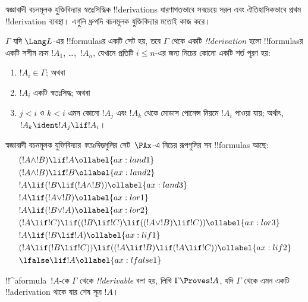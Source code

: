 \documentclass[../../../include/open-logic-section]{subfiles}
\begin{document}


স্বজ্ঞাবাদী বচনমূলক যুক্তিবিদ্যার স্বতঃসিদ্ধিক !!{derivation}s ধারণাগতভাবে
সবচেয়ে সরল এবং ঐতিহাসিকভাবে প্রথম !!{derivation} ব্যবস্থা। এগুলি
ধ্রুপদি বচনমূলক যুক্তিবিদ্যার মতোই কাজ করে।

\begin{defn}[!!^{derivability}]
$\Gamma$ যদি $\Lang L$-এর !!{formula}sর একটি সেট হয়, তবে
$\Gamma$ থেকে একটি \emph{!!{derivation}} হলো !!{formula}sর একটি সসীম
ক্রম $!A_1$, \dots,~$!A_n$, যেখানে প্রতিটি $i \le n$-এর জন্য নিচের
কোনো একটি শর্ত পূরণ হয়:
\begin{enumerate}
\item $!A_i \in \Gamma$; অথবা
\item $!A_i$ একটি স্বতঃসিদ্ধ; অথবা
\item $j < i$ ও $k < i$ এমন কোনো $!A_j$ এবং $!A_k$ থেকে মোডাস পোনেন্স
  নিয়মে $!A_i$ পাওয়া যায়; অর্থাৎ, $!A_k \ident !A_j \lif !A_i$।
\end{enumerate}
\end{defn}

\begin{defn}[স্বতঃসিদ্ধ]
স্বজ্ঞাবাদী বচনমূলক যুক্তিবিদ্যার \emph{স্বতঃসিদ্ধ}গুলির সেট~$\PAx$-এ
নিচের রূপগুলির সব !!{formula}s আছে:
\begin{align}
  & (!A \land !B) \lif !A \ollabel{ax:land1}\\
  & (!A \land !B) \lif !B \ollabel{ax:land2}\\
  & !A \lif (!B \lif (!A \land !B)) \ollabel{ax:land3}\\
  & !A \lif (!A \lor !B) \ollabel{ax:lor1}\\
  & !A \lif (!B \lor !A) \ollabel{ax:lor2}\\
  & (!A \lif !C) \lif ((!B \lif !C) \lif ((!A \lor !B) \lif !C)) \ollabel{ax:lor3}\\
  & !A \lif (!B \lif !A) \ollabel{ax:lif1}\\
  & (!A \lif (!B \lif !C)) \lif ((!A \lif !B) \lif (!A \lif !C)) \ollabel{ax:lif2}\\
  & \lfalse \lif !A \ollabel{ax:lfalse1}
\end{align}
\end{defn}

\begin{defn}[!!^{derivability}]
!!^a{formula}~$!A$-কে $\Gamma$ থেকে \emph{!!{derivable}} বলা হয়,
লিখি $\Gamma \Proves !A$, যদি $\Gamma$ থেকে এমন একটি !!a{derivation}
থাকে যার শেষ সূত্র $!A$।
\end{defn}
\end{document}
